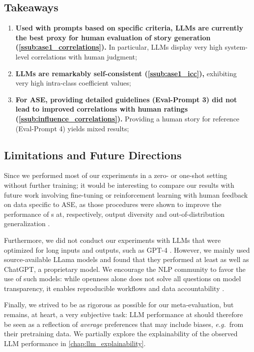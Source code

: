 \subsection{Takeaways}

\begin{enumerate}
    \item \textbf{Used with prompts based on specific criteria, LLMs are currently the best proxy for human evaluation of story generation (\autoref{ssub:ase1_correlations}).} In particular, LLMs display very high system-level correlations with human judgment;
    \item \textbf{LLMs are remarkably self-consistent (\autoref{ssub:ase1_icc}),} exhibiting very high intra-class coefficient values;
    \item \textbf{For ASE, providing detailed guidelines (Eval-Prompt 3) did not lead to improved correlations with human ratings (\autoref{ssub:influence_correlations}).} Providing a human story for reference (Eval-Prompt 4) yields mixed results;
\end{enumerate}

\subsection{Limitations and Future Directions}

Since we performed most of our experiments in a zero- or one-shot setting without further training; it would be interesting to compare our results with future work involving fine-tuning or reinforcement learning with human feedback on data specific to ASE, as those procedures were shown to improve the performance of {\llm}s at, respectively, output diversity and out-of-distribution generalization \citep{kirk2024understanding}.

Furthermore, we did not conduct our experiments with LLMs that were optimized for long inputs and outputs, such as GPT-4 \citep{achiam2023gpt}. However, we mainly used source-available LLama models and found that they performed at least as well as ChatGPT, a proprietary model. We encourage the NLP community to favor the use of such models: while openness alone does not solve all questions on model transparency, it enables reproducible workflows and data accountability \citep{liesenfeld2023opening}.

Finally, we strived to be as rigorous as possible for our meta-evaluation, but {\ase} remains, at heart, a very subjective task: LLM performance at {\ase} should therefore be seen as a reflection of \textit{average} preferences that may include biases, \textit{e.g.}\ from their pretraining data. We partially explore the explainability of the observed LLM performance in \autoref{chap:llm_explainability}.